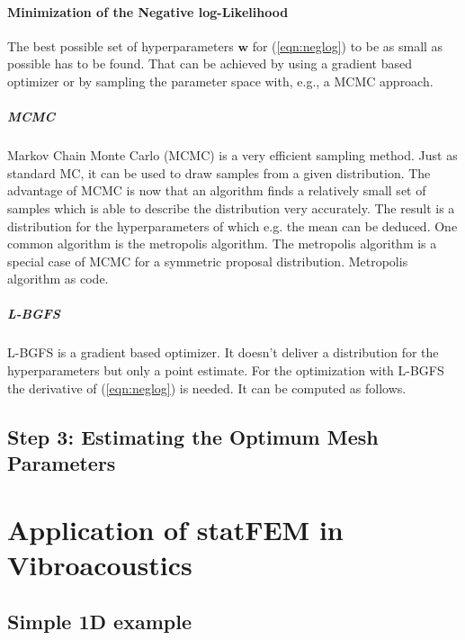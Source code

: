 \documentclass[%
  a4paper,oneside,%
  11pt,%
  smallchapters,
  green,%
  rgb, <cmyk>
  ]{tubsbook}
\begin{document}
\subsubsection{Minimization of the Negative log-Likelihood}
The best possible set of hyperparameters $\bm{w}$ for (\ref{eqn:neglog}) to be as small as possible has to be found. That can be achieved by using a gradient based optimizer or by sampling the parameter space with, e.g., a MCMC approach.
\paragraph{MCMC}
Markov Chain Monte Carlo (MCMC) is a very efficient sampling method. Just as standard MC, it can be used to draw samples from a given distribution. The advantage of MCMC is now that an algorithm finds a relatively small set of samples which is able to describe the distribution very accurately. The result is a distribution for the hyperparameters of which e.g. the mean can be deduced. One common algorithm is the metropolis algorithm.
The metropolis algorithm is a special case of MCMC for a symmetric proposal distribution.
Metropolis algorithm as code. 



\paragraph{L-BGFS}
L-BGFS is a gradient based optimizer. It doesn't deliver a distribution for the hyperparameters but only a point estimate.
For the optimization with L-BGFS the derivative of (\ref{eqn:neglog}) is needed. It can be computed as follows.





\section{Step 3: Estimating the Optimum Mesh Parameters}


\chapter{Application of statFEM in Vibroacoustics}

\section{Simple 1D example}
\end{document}
